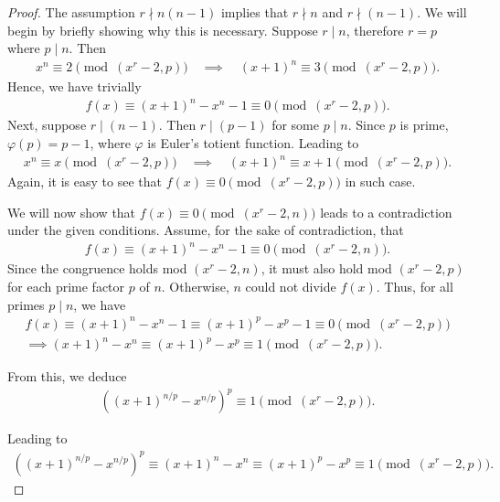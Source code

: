 \documentclass{article}
\theoremstyle{plain}
\theoremstyle{definition}
\begin{document}
\begin{proof}
The assumption $r \nmid n (n-1)$ implies that $r \nmid n$ and $r \nmid (n-1)$. We will begin by briefly showing why this is necessary. Suppose $r \mid n$, therefore $r = p$ where $p \mid n$. Then
\begin{align*}
    x^n \equiv 2 \pmod{(x^r-2, p)}
    \quad \implies \quad
    (x+1)^n \equiv 3 \pmod{(x^r-2, p)} .
\end{align*}
Hence, we have trivially
\begin{align*}
    f(x) \equiv (x+1)^n - x^n - 1 \equiv 0 \pmod{(x^r-2, p)} .
\end{align*}
Next, suppose $r \mid (n-1)$. Then $r \mid (p-1)$ for some $p \mid n$. Since $p$ is prime, $\varphi(p) = p-1$, where $\varphi$ is Euler's totient function. Leading to
\begin{align*}
    x^n \equiv x \pmod{(x^r-2, p)}
    \quad \implies \quad
    (x+1)^n \equiv x+1 \pmod{(x^r-2, p)} .
\end{align*}
Again, it is easy to see that $f(x) \equiv 0 \pmod{(x^r-2, p)}$ in such case.

We will now show that $f(x) \equiv 0 \pmod{(x^r-2, n)}$ leads to a contradiction under the given conditions. Assume, for the sake of contradiction, that
\begin{align*}
    f(x) \equiv (x+1)^n - x^n - 1 \equiv 0 \pmod{(x^r-2, n)} .
\end{align*}
Since the congruence holds mod $(x^r-2, n)$, it must also hold mod $(x^r-2, p)$ for each prime factor $p$ of $n$. Otherwise, $n$ could not divide $f(x)$. Thus, for all primes $p \mid n$, we have
\begin{align*}
f(x) \equiv (x+1)^n - x^n - 1 \equiv (x+1)^p - x^p - 1 \equiv 0 \pmod{(x^r-2, p)} \\
\implies (x+1)^n - x^n \equiv (x+1)^p - x^p \equiv 1 \pmod{(x^r-2, p)} .
\end{align*}

From this, we deduce
\begin{align*}
\left( (x+1)^{n/p} - x^{n/p} \right)^p \equiv 1 \pmod{(x^r-2, p)} .
\end{align*}

Leading to
\begin{align*}
\left( (x+1)^{n/p} - x^{n/p} \right)^p \equiv (x+1)^n - x^n \equiv (x+1)^p - x^p \equiv 1 \pmod{(x^r-2, p)} .
\end{align*}


\end{proof}
\end{document}
